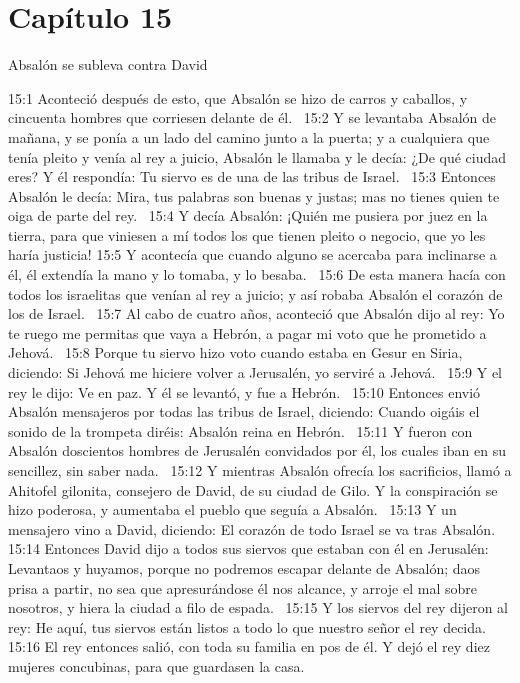 \section*{Capítulo 15}
Absalón se subleva contra David  

15:1 Aconteció después de esto, que Absalón se hizo de carros y caballos, y cincuenta hombres que corriesen delante de él.  
15:2 Y se levantaba Absalón de mañana, y se ponía a un lado del camino junto a la puerta; y a cualquiera que tenía pleito y venía al rey a juicio, Absalón le llamaba y le decía: ¿De qué ciudad eres? Y él respondía: Tu siervo es de una de las tribus de Israel.  
15:3 Entonces Absalón le decía: Mira, tus palabras son buenas y justas; mas no tienes quien te oiga de parte del rey.  
15:4 Y decía Absalón: ¡Quién me pusiera por juez en la tierra, para que viniesen a mí todos los que tienen pleito o negocio, que yo les haría justicia! 
15:5 Y acontecía que cuando alguno se acercaba para inclinarse a él, él extendía la mano y lo tomaba, y lo besaba.  
15:6 De esta manera hacía con todos los israelitas que venían al rey a juicio; y así robaba Absalón el corazón de los de Israel.  
15:7 Al cabo de cuatro años, aconteció que Absalón dijo al rey: Yo te ruego me permitas que vaya a Hebrón, a pagar mi voto que he prometido a Jehová.  
15:8 Porque tu siervo hizo voto cuando estaba en Gesur en Siria, diciendo: Si Jehová me hiciere volver a Jerusalén, yo serviré a Jehová.  
15:9 Y el rey le dijo: Ve en paz. Y él se levantó, y fue a Hebrón.  
15:10 Entonces envió Absalón mensajeros por todas las tribus de Israel, diciendo: Cuando oigáis el sonido de la trompeta diréis: Absalón reina en Hebrón.  
15:11 Y fueron con Absalón doscientos hombres de Jerusalén convidados por él, los cuales iban en su sencillez, sin saber nada.  
15:12 Y mientras Absalón ofrecía los sacrificios, llamó a Ahitofel gilonita, consejero de David, de su ciudad de Gilo. Y la conspiración se hizo poderosa, y aumentaba el pueblo que seguía a Absalón.  
15:13 Y un mensajero vino a David, diciendo: El corazón de todo Israel se va tras Absalón.  
15:14 Entonces David dijo a todos sus siervos que estaban con él en Jerusalén: Levantaos y huyamos, porque no podremos escapar delante de Absalón; daos prisa a partir, no sea que apresurándose él nos alcance, y arroje el mal sobre nosotros, y hiera la ciudad a filo de espada.  
15:15 Y los siervos del rey dijeron al rey: He aquí, tus siervos están listos a todo lo que nuestro señor el rey decida.  
15:16 El rey entonces salió, con toda su familia en pos de él. Y dejó el rey diez mujeres concubinas, para que guardasen la casa.  
